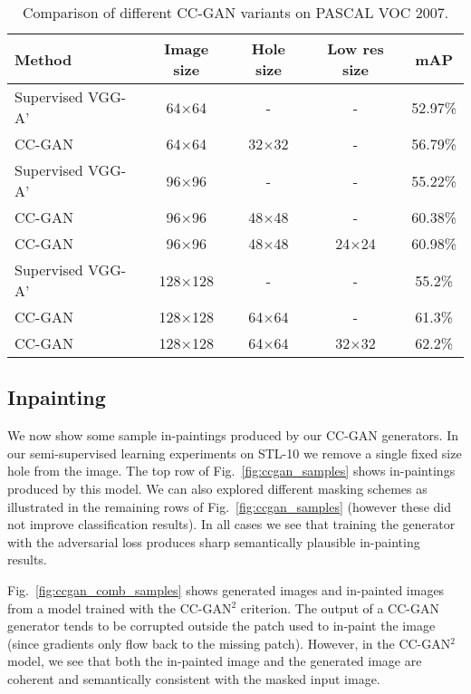 \documentclass{article} \usepackage{iclr2017_conference,times}
\newcommand{\fig}[1]{Fig.~\ref{fig:#1}}
\begin{document}
\begin{table}[!t]
\centering
\small
\begin{tabularx}{0.8\textwidth}{l|c|c|c|c}
\bf{Method} & {\bf Image size} & {\bf Hole size} & {\bf Low res size} & \bf{mAP}\\
\hline
\hline
Supervised VGG-A' & 64$\times$64 & - & - & 52.97\%\\
CC-GAN & 64$\times$64 & 32$\times$32 & - & 56.79\%\\
\hline
Supervised VGG-A' & 96$\times$96 & - & - & 55.22\%\\
CC-GAN & 96$\times$96 & 48$\times$48 & - & 60.38\%\\
CC-GAN & 96$\times$96 & 48$\times$48 & 24$\times$24 & 60.98\%\\
\hline
Supervised VGG-A' & 128$\times$128 & - & - & 55.2\%\\
CC-GAN & 128$\times$128 & 64$\times$64 & - & 61.3\%\\
CC-GAN & 128$\times$128 & 64$\times$64 & 32$\times$32  & 62.2\%\\
\end{tabularx}
\vspace{2mm}
\caption{Comparison of different CC-GAN variants on PASCAL VOC 2007.}
\label{tab:pascal_detail}
\end{table}




\subsection{Inpainting}
We now show some sample in-paintings produced by our CC-GAN
generators.  In our semi-supervised learning experiments on STL-10 we
remove a single fixed size hole from the image.  The top row of
\fig{ccgan_samples} shows in-paintings produced by this model.  We can
also explored different masking schemes as illustrated in the
remaining rows of \fig{ccgan_samples} (however these did not improve
classification results).  In all cases we see that
training the generator with the adversarial loss produces sharp
semantically plausible in-painting results.

\fig{ccgan_comb_samples} shows generated images and in-painted images
from a model trained with the CC-GAN$^2$ criterion.  The output of a
CC-GAN generator tends to be corrupted outside the patch used to
in-paint the image (since gradients only flow back to the missing patch). However, in the CC-GAN$^2$ model, we see that both the
in-painted image and the generated image are coherent and semantically
consistent with the masked input image.
\end{document}
